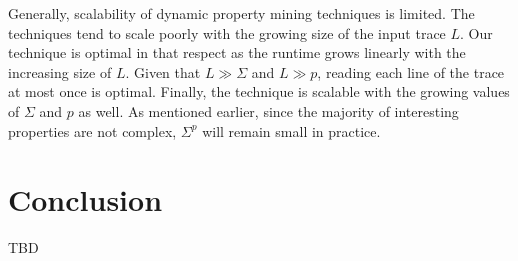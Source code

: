 \documentclass[]{sigplanconf}
\begin{document}
Generally, scalability of dynamic property mining techniques is limited.
The techniques tend to scale poorly with the growing size of the input trace $L$. Our technique is optimal in that respect as the runtime grows linearly with the increasing size of $L$. Given that $L \gg \Sigma$ and $L \gg p$, reading each line of the trace at most once is optimal.
Finally, the technique is scalable with the growing values of $\Sigma$ and $p$ as well. As mentioned earlier, since the majority of interesting properties are not complex, $\Sigma^p$ will remain small in practice.


\section{Conclusion}

TBD


%


\end{document}
